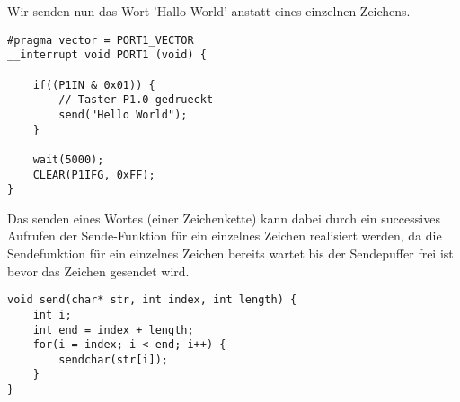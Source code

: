 \documentclass[11pt,a4paper,ngerman]{article}
\begin{document}
\begin{description}
Wir senden nun das Wort 'Hallo World' anstatt eines einzelnen Zeichens.
\begin{lstlisting}
#pragma vector = PORT1_VECTOR
__interrupt void PORT1 (void) {

	if((P1IN & 0x01)) {
		// Taster P1.0 gedrueckt
		send("Hello World");
	}

	wait(5000);
	CLEAR(P1IFG, 0xFF);
}
\end{lstlisting}

Das senden eines Wortes (einer Zeichenkette) kann dabei durch ein successives Aufrufen der Sende-Funktion für
ein einzelnes Zeichen realisiert werden, da die Sendefunktion für ein einzelnes Zeichen bereits wartet bis der Sendepuffer
frei ist bevor das Zeichen gesendet wird.

\begin{lstlisting}
void send(char* str, int index, int length) {
	int i;
	int end = index + length;
	for(i = index; i < end; i++) {
		sendchar(str[i]);	
	}
}
\end{lstlisting}
\end{description}
\end{document}
